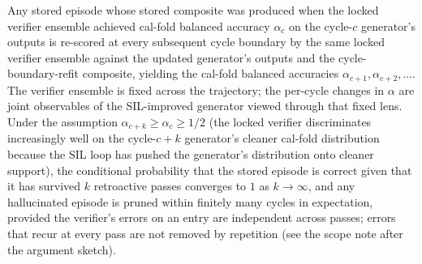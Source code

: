 \begin{heuristic}
\label{cor:self-correction}
Any stored episode whose stored composite was produced when the locked verifier ensemble achieved cal-fold balanced accuracy $\alpha_c$ on the cycle-$c$ generator's outputs is re-scored at every subsequent cycle boundary by the same locked verifier ensemble against the updated generator's outputs and the cycle-boundary-refit composite, yielding the cal-fold balanced accuracies $\alpha_{c+1}, \alpha_{c+2}, \dots$. The verifier ensemble is fixed across the trajectory; the per-cycle changes in $\alpha$ are joint observables of the SIL-improved generator viewed through that fixed lens. Under the assumption $\alpha_{c+k} \ge \alpha_c \ge 1/2$ (the locked verifier discriminates increasingly well on the cycle-$c+k$ generator's cleaner cal-fold distribution because the SIL loop has pushed the generator's distribution onto cleaner support), the conditional probability that the stored episode is correct given that it has survived $k$ retroactive passes converges to $1$ as $k \to \infty$, and any hallucinated episode is pruned within finitely many cycles in expectation, provided the verifier's errors on an entry are independent across passes; errors that recur at every pass are not removed by repetition (see the scope note after the argument sketch).
\end{heuristic}


